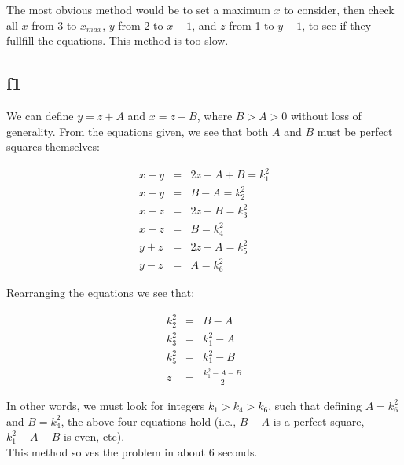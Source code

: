 \documentclass[english]{article}
\begin{document}
The most obvious method would be to set a maximum $x$ to consider, then check all $x$ from 3 to $x_{max}$, $y$ from 2 to $x-1$, and $z$ from 1 to $y-1$, to see if they fullfill the equations. This method is too slow.

\subsection{f1}

We can define $y = z + A$ and $x = z + B$, where $B > A > 0$ without loss of generality. From the equations given, we see that both $A$ and $B$ must be perfect squares themselves:

\begin{eqnarray}
x+y &=& 2z + A + B = k_1^2 \\
x-y &=& B - A = k_2^2 \\
x+z &=& 2z + B = k_3^2 \\
x-z &=& B = k_4^2 \\
y+z &=& 2z + A = k_5^2 \\
y-z &=& A = k_6^2
\end{eqnarray}

Rearranging the equations we see that:

\begin{eqnarray}
k_2^2 &=& B - A \\
k_3^2 &=& k_1^2 - A \\
k_5^2 &=& k_1^2 - B \\
z &=& \frac{k_1^2 - A - B}{2}
\end{eqnarray}

In other words, we must look for integers $k_1 > k_4 > k_6$, such that defining $A = k_6^2$ and $B = k_4^2$, the above four equations hold (i.e., $B-A$ is a perfect square, $k_1^2 - A - B$ is even, etc).\\

This method solves the problem in about 6 seconds.
\end{document}
